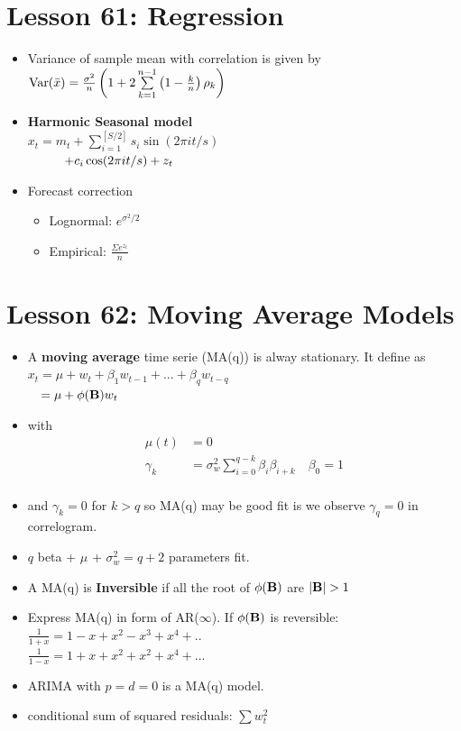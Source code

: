 \documentclass[10pt, french]{article}
\begin{document}
\begin{multicols*}{3}
\section*{Lesson 61: Regression}
\begin{itemize}[align=left,leftmargin=*]
    \item Variance of sample mean with correlation is given by \\ $\mathrm{Var} {\left( \bar{x} \right)} = \frac{\sigma^2}{n} \left(1 + 2\sum\limits_{k=1}^{n-1} \left(1 - \frac{k}{n}\right)\rho_k\right)$
    \item \textbf{Harmonic Seasonal model}\\
    $x_t = m_t + \sum_{i=1}^{[S/2]} s_i \sin(2\pi i t/s) $\\
    $\hspace*{1cm}+ c_i \cos(2\pi i t/s) + z_t$
    \item Forecast correction
    \begin{itemize}
       \item Lognormal: $e^{\sigma^2/2}$ 
       \item Empirical: $\frac{\Sigma e^{z_t}}{n}$
    \end{itemize}
\end{itemize}

\section*{Lesson 62: Moving Average Models}
\begin{itemize}[align=left,leftmargin=*]
   \item A \textbf{moving average} time serie (MA(q)) is alway stationary. It define as \\ 
    $x_t = \mu + w_t + \beta_1 w_{t-1} + ... + \beta_q w_{t-q}$ \\ 
    $\hspace*{0.35cm}= \mu + \phi(\mathbf{B})w_t$ 
    \item[] with 
    \begin{align*}
      \mu(t) &= 0 \\  
       \gamma_k &= \sigma_w^2 \sum_{i=0}^{q-k} \beta_i \beta_{i+k}\quad \beta_0 = 1\\
    \end{align*} 
    \item[] and $\gamma_k = 0$ for $k>q$ so MA(q) may be good fit is we observe $\gamma_q = 0$ in correlogram.
    \item $q$ beta + $\mu$ + $\sigma_w^2 = q+2$ parameters fit.
    \item A MA(q) is \textbf{Inversible} if all the root of 
    $ \phi(\mathbf{B})$ are $|\matr{B}|>1$
    \item Express MA(q) in form of AR($\infty$). If $ \phi(\mathbf{B})$ is reversible: \\
    $\frac{1}{1+x} = 1 - x + x^2 - x^3 + x^4 + ..$\\
    $\frac{1}{1-x} = 1 + x + x^2 + x^2 + x^4 + ...$
    \item ARIMA with $p = d = 0$ is a MA(q) model.
    \item conditional sum of squared residuals: $\sum w_t^2$
\end{itemize} 



\end{multicols*}
\end{document}

